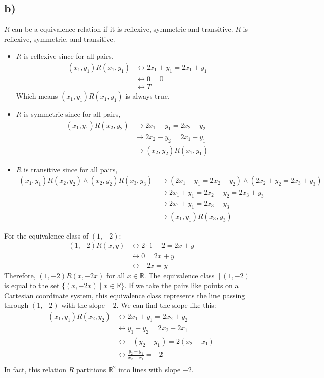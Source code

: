 \documentclass[12pt]{article}
\newcommand{\+}{\mkern2mu}
\begin{document}
\subsection*{b) }
$R$ can be a equivalence relation if it is reflexive, symmetric and transitive.
$R$ is reflexive, symmetric, and transitive.
\begin{itemize}
\item $R$ is reflexive since for all pairs,
    \begin{align*}
    (x_1, y_1)R(x_1, y_1) &\leftrightarrow 2x_1 + y_1 = 2x_1 + y_1 \\
    &\leftrightarrow 0 = 0 \\
    &\leftrightarrow T
    \end{align*}
    Which means $(x_1, y_1)R(x_1, y_1)$ is always true.
\item $R$ is symmetric since for all pairs,
    \begin{align*}
    (x_1, y_1)R(x_2, y_2) &\to 2x_1 + y_1 = 2x_2 + y_2 \\
    &\to 2x_2 + y_2 = 2x_1 + y_1 \\
    &\to (x_2, y_2)R(x_1, y_1)
    \end{align*}
\item $R$ is transitive since for all pairs,
    \begin{align*}
    (x_1, y_1)R(x_2, y_2) \land (x_2, y_2)R(x_3, y_3) &\to (2x_1 + y_1 = 2x_2 + y_2) \land (2x_2 + y_2 = 2x_3 + y_3) \\
    &\to 2x_1 + y_1 = 2x_2 + y_2 = 2x_3 + y_3 \\
    &\to 2x_1 + y_1 = 2x_3 + y_3 \\
    &\to (x_1, y_1)R(x_3, y_3)
    \end{align*}
\end{itemize}
For the equivalence class of $(1, -2)$:
\begin{align*}
(1, -2)R(x, y) &\leftrightarrow 2 \cdot 1 - 2 = 2x + y \\
&\leftrightarrow 0 = 2x + y \\
&\leftrightarrow -2x = y
\end{align*}
Therefore, $(1, -2)R(x, -2x)$ for all $x \in \mathbb{R}$.
The equivalence class $[(1, -2)]$ is equal to the set $\{(x, -2x) \mid x \in \mathbb{R}\}$.
If we take the pairs like points on a Cartesian coordinate system, this equivalence class represents the line passing through $(1, -2)$ with the slope $-2$. We can find the slope like this:
\begin{align*}
(x_1, y_1)R(x_2, y_2) &\leftrightarrow 2x_1 + y_1 = 2x_2 + y_2 \\
&\leftrightarrow y_1 - y_2 = 2x_2 - 2x_1 \\
&\leftrightarrow -(y_2 - y_1) = 2(x_2 - x_1) \\
&\leftrightarrow \frac{y_2 - y_1}{x_2 - x_1} = -2 \\
\end{align*}
In fact, this relation $R$ partitions $\mathbb{R}^2$ into lines with slope $-2$.
\end{document}
